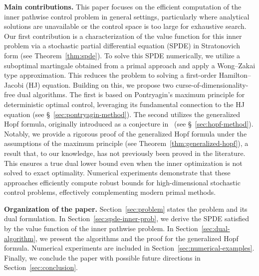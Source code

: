\documentclass[11pt]{article}
\numberwithin{equation}{section}
\theoremstyle{plain}
\theoremstyle{definition}
\theoremstyle{remark}
\begin{document}
\vskip 2pt
\noindent\textbf{Main contributions.} 
This paper focuses on the efficient computation of the inner pathwise control problem in general settings, particularly where analytical solutions are unavailable or the control space is too large for exhaustive search. Our first contribution is a characterization of the value function for this inner problem via a stochastic partial differential equation (SPDE) in Stratonovich form (see Theorem~\ref{thm:spde}). 
To solve this SPDE numerically, we utilize a suboptimal martingale obtained from a primal approach and apply a Wong--Zakai type approximation. This reduces the problem to solving a first-order Hamilton--Jacobi (HJ) equation. Building on this, we propose two curse-of-dimensionality-free dual algorithms.
The first is based on Pontryagin's maximum principle for deterministic optimal control, leveraging its fundamental connection to the HJ equation (see \S~\ref{sec:pontryagin-method}).
The second utilizes the generalized Hopf formula, originally introduced as a conjecture in~\cite{chow2019algorithm}  (see \S~\ref{sec:hopf-method}). 
Notably, we provide a rigorous proof of the generalized Hopf formula under the assumptions of the maximum principle (see Theorem~\ref{thm:generalized-hopf}), a result that, to our knowledge, has not previously been proved in the literature. This ensures a true dual lower bound even when the inner optimization is not solved to exact optimality. Numerical experiments demonstrate that these approaches efficiently compute robust bounds for high-dimensional stochastic control problems, effectively complementing modern primal methods.

\vskip 2pt
\noindent\textbf{Organization of the paper.}
Section~\ref{sec:problem} states the problem and its dual formulation. In Section~\ref{sec:spde-inner-prob}, we derive the SPDE satisfied by the value function of the inner pathwise problem. In Section~\ref{sec:dual-algorithm}, we present the algorithms and the proof for the generalized Hopf formula. Numerical experiments are included in Section~\ref{sec:numerical-examples}. Finally, we conclude the paper with possible future directions in Section~\ref{sec:conclusion}. 
\end{document}
